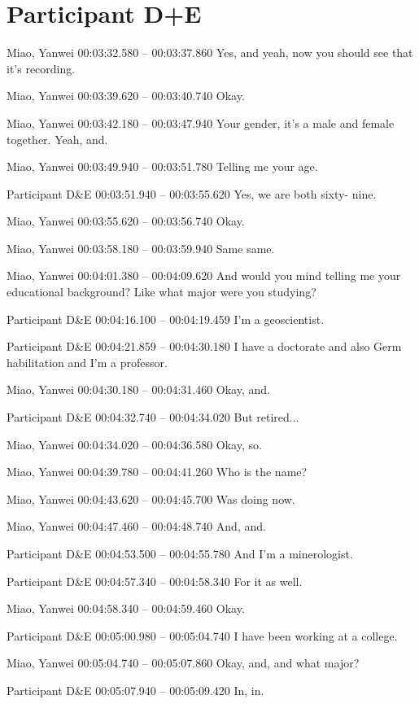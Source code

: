 \section*{Participant D+E}

{\parindent0pt
\tiny
\singlespacing
Miao, Yanwei 00:03:32.580 -- 00:03:37.860
Yes, and yeah, now you should see that it's recording.

Miao, Yanwei 00:03:39.620 -- 00:03:40.740
Okay.

Miao, Yanwei 00:03:42.180 -- 00:03:47.940
Your gender, it's a male and female together. Yeah, and.

Miao, Yanwei 00:03:49.940 -- 00:03:51.780
Telling me your age.

Participant D\&E 00:03:51.940 -- 00:03:55.620
Yes, we are both sixty- nine.

Miao, Yanwei 00:03:55.620 -- 00:03:56.740
Okay.

Miao, Yanwei 00:03:58.180 -- 00:03:59.940
Same same.

Miao, Yanwei 00:04:01.380 -- 00:04:09.620
And would you mind telling me your educational background? Like what major were you studying?

Participant D\&E 00:04:16.100 -- 00:04:19.459
I'm a geoscientist.

Participant D\&E 00:04:21.859 -- 00:04:30.180
I have a doctorate and also Germ habilitation and I'm a professor.

Miao, Yanwei 00:04:30.180 -- 00:04:31.460
Okay, and.

Participant D\&E 00:04:32.740 -- 00:04:34.020
But retired...

Miao, Yanwei 00:04:34.020 -- 00:04:36.580
Okay, so.

Miao, Yanwei 00:04:39.780 -- 00:04:41.260
Who is the name?

Miao, Yanwei 00:04:43.620 -- 00:04:45.700
Was doing now.

Miao, Yanwei 00:04:47.460 -- 00:04:48.740
And, and.

Participant D\&E 00:04:53.500 -- 00:04:55.780
And I'm a minerologist.

Participant D\&E 00:04:57.340 -- 00:04:58.340
For it as well.

Miao, Yanwei 00:04:58.340 -- 00:04:59.460
Okay.

Participant D\&E 00:05:00.980 -- 00:05:04.740
I have been working at a college.

Miao, Yanwei 00:05:04.740 -- 00:05:07.860
Okay, and, and what major?

Participant D\&E 00:05:07.940 -- 00:05:09.420
In, in.

}
